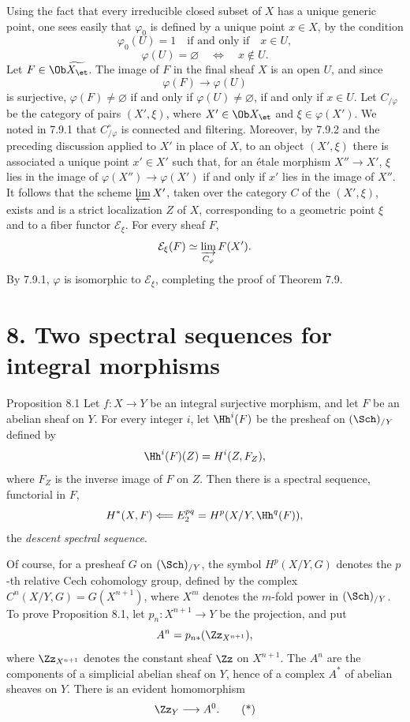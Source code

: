 Using the fact that every irreducible closed subset of \(X\) has a unique generic point, one sees easily that \(\varphi_0\) is defined by a unique point \(x\in X\), by the condition
\[
\varphi_0(U)=1\quad\text{if and only if}\quad x\in U,
\]
\ie
\[
\varphi(U)=\varnothing\quad\Longleftrightarrow\quad x\notin U.
\]
Let \(F\in\Ob\widetilde{X_{\et}}\). The image of \(F\) in the final sheaf \(X\) is an open \(U\), and since
\[
\varphi(F)\longrightarrow\varphi(U)
\]
is surjective, \(\varphi(F)\ne\varnothing\) if and only if \(\varphi(U)\ne\varnothing\), \ie if and only if \(x\in U\). Let \(C_{/\varphi}\) be the category of pairs \((X',\xi)\), where \(X'\in\Ob X_{\et}\) and \(\xi\in\varphi(X')\). We noted in 7.9.1 that \(C_{/\varphi}^\circ\) is connected and filtering. Moreover, by 7.9.2 and the preceding discussion applied to \(X'\) in place of \(X\), to an object \((X',\xi)\) there is associated a unique point \(x'\in X'\) such that, for an \'etale morphism \(X''\to X'\), \(\xi\) lies in the image of \(\varphi(X'')\to\varphi(X')\) if and only if \(x'\) lies in the image of \(X''\). It follows that the scheme \(\varprojlim X'\), taken over the category \(C\) of the \((X',\xi)\), exists and is a strict localization \(Z\) of \(X\), corresponding to a geometric point \(\xi\) and to a fiber functor \(\mathcal E_\xi\). For every sheaf \(F\),
\[
\mathcal E_\xi(F)\simeq \varinjlim_{C_\varphi}F(X').
\]
By 7.9.1, \(\varphi\) is isomorphic to \(\mathcal E_\xi\), completing the proof of Theorem 7.9.

\section*{8. Two spectral sequences for integral morphisms}

\begin{statement}{Proposition 8.1}
Let \(f:X\to Y\) be an integral surjective morphism, and let \(F\) be an abelian sheaf on \(Y\). For every integer \(i\), let \(\Hh^i(F)\) be the presheaf on \((\Sch)_{/Y}\) defined by
\[
\Hh^i(F)(Z)=H^i(Z,F_Z),
\]
where \(F_Z\) is the inverse image of \(F\) on \(Z\). Then there is a spectral sequence, functorial in \(F\),
\[
H^*(X,F)\Longleftarrow E_2^{pq}=H^p(X/Y,\Hh^q(F)),
\]
the \emph{descent spectral sequence}.
\end{statement}

Of course, for a presheaf \(G\) on \((\Sch)_{/Y}\), the symbol \(H^p(X/Y,G)\) denotes the \(p\)-th relative Cech cohomology group, defined by the complex \(C^n(X/Y,G)=G(X^{n+1})\), where \(X^m\) denotes the \(m\)-fold power in \((\Sch)_{/Y}\). To prove Proposition 8.1, let \(p_n:X^{n+1}\to Y\) be the projection, and put
\[
A^n=p_{n*}(\Zz_{X^{n+1}}),
\]
where \(\Zz_{X^{n+1}}\) denotes the constant sheaf \(\Zz\) on \(X^{n+1}\). The \(A^n\) are the components of a simplicial abelian sheaf on \(Y\), hence of a complex \(A^*\) of abelian sheaves on \(Y\). There is an evident homomorphism
\[
\Zz_Y\longrightarrow A^0.
\tag{*}
\]

